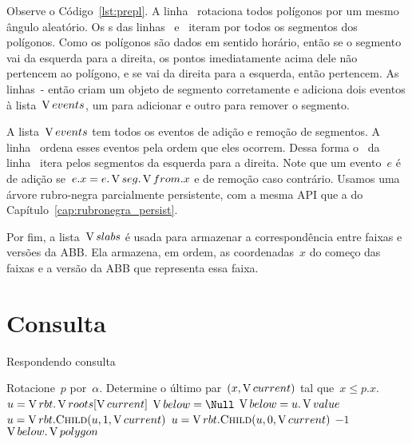 \documentclass[main.tex]{subfiles}
\begin{document}
Observe o Código~\ref{lst:prepl}. A linha~ rotaciona todos polígonos por um mesmo ângulo aleatório. Os s das linhas~ e~ iteram por todos os segmentos dos polígonos. Como os polígonos são dados em sentido horário, então se o segmento vai da esquerda para a direita, os pontos imediatamente acima dele não pertencem ao polígono, e se vai da direita para a esquerda, então pertencem. As linhas~\mbox{-} então criam um objeto de segmento corretamente e adiciona dois eventos à lista~$\operatorname{V}{events}$, um para adicionar e outro para remover o segmento.

A lista~$\operatorname{V}{events}$ tem todos os eventos de adição e remoção de segmentos. A linha~ ordena esses eventos pela ordem que eles ocorrem. Dessa forma o~ da linha~ itera pelos segmentos da esquerda para a direita. Note que um evento~$e$ é de adição se~${e.x = e.\operatorname{V}{seg}.\operatorname{V}{from}.x}$ e de remoção caso contrário. Usamos uma árvore rubro-negra parcialmente persistente, com a mesma API que a do Capítulo~\ref{cap:rubronegra_persist}.

Por fim, a lista~$\operatorname{V}{slabs}$ é usada para armazenar a correspondência entre faixas e versões da ABB. Ela armazena, em ordem, as coordenadas~$x$ do começo das faixas e a versão da ABB que representa essa faixa.

\section{Consulta}


\providecommand{\roots}{\V{roots}}
\providecommand{\below}{\V{below}}
\providecommand{\val}{\V{value}}

\begin{algorithm}
\caption{Respondendo consulta} \label{lst:consulta_pl}
\begin{algorithmic}[1]

	\State Rotacione~$p$ por~$\alpha$.
	\State Determine o último par~$(x, \operatorname{V}{current})$ tal que~$x \leq p.x$. 
	\State $u = \rbt.\roots[\current]$
	\State $\below = \Null$
		\If{$u.\val.\Call{HeightAt}{p.x} < p.y$} 
			\State $\below = u.\val$
			\State $u = \rbt.\Call{Child}{u, 1, \current}$
		\Else
			\State $u = \rbt.\Call{Child}{u, 0, \current}$
		\EndIf
	\EndWhile
	\If{$\below = \Null$}
		\State \Return $-1$
	\Else
		\State \Return $\below.\polygon$
	\EndIf
\EndFunction

\end{algorithmic}
\end{algorithm}
\end{document}
